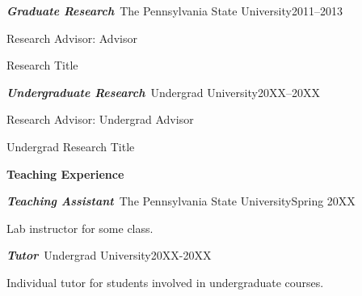\documentclass[11pt]{psuthesis}
\begin{document}
{\begin{singlespace}
%

\medskip

\par\noindent
\textbf{\textit{Graduate Research}}\, The Pennsylvania State University\hfill 2011--2013
\par\noindent
Research Advisor: Advisor

\smallskip

\par\noindent
\hspace{0.10truein}  
\parbox{5.7truein}{
\par\noindent
Research Title
}

\medskip

\par\noindent
\textbf{\textit{Undergraduate Research}}\, Undergrad University\hfill 20XX--20XX
\par\noindent
Research Advisor: Undergrad Advisor

\smallskip

\par\noindent
\hspace{0.10truein}  
\parbox{5.7truein}{
\par\noindent
Undergrad Research Title
}

\medskip

\large
\centerline{{\bf Teaching Experience}}
\normalsize

%
%
%

\medskip

\par\noindent
\textbf{\textit{Teaching Assistant}}\, The Pennsylvania State University\hfill Spring 20XX

\smallskip

\par\noindent
\hspace{0.10truein}  
\parbox{5.7truein}{
\par\noindent
Lab instructor for some class.
}

\medskip

\par\noindent
\textbf{\textit{Tutor}}\, Undergrad University\hfill 20XX-20XX

\smallskip

\par\noindent
\hspace{0.10truein}  
\parbox{5.7truein}{
\par\noindent
Individual tutor for students involved in undergraduate courses.
}
\end{singlespace}
}
\end{document}
